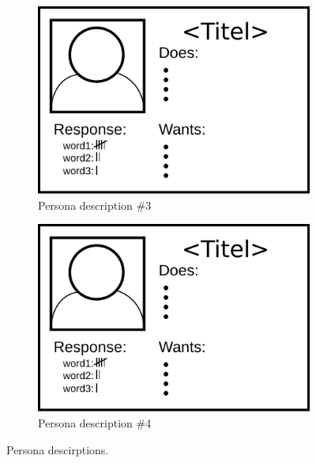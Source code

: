 \begin{figure}[H]
    \begin{subfigure}[b]{0.475\textwidth}
      \includegraphics[width=\textwidth]{images/template_persona.pdf}
      \caption{Persona description \#3}
    \end{subfigure}
    \hfill
    \begin{subfigure}[b]{0.475\textwidth}
      \includegraphics[width=\textwidth]{images/template_persona.pdf}
      \caption{Persona description \#4}
    \end{subfigure}
    \caption{Persona descirptions.}
  \end{figure}

